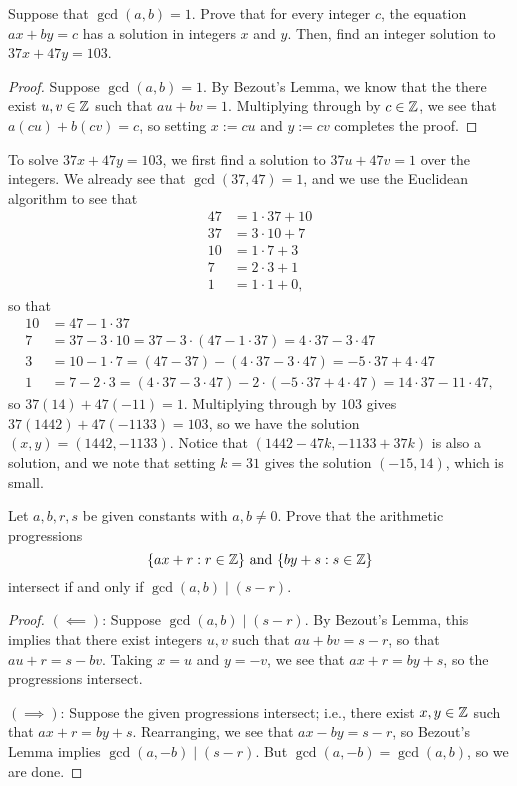 \documentclass{article}
\begin{document}
\begin{exercise}[Chapter 6, \#5]
Suppose that $\gcd(a,b)=1$. Prove that for every integer $c$, the equation $ax+by = c$ has a solution in integers $x$ and $y$. Then, find an integer solution to $37x+47y=103$.
\end{exercise}
\begin{proof}
Suppose $\gcd(a,b)=1$. By Bezout's Lemma, we know that the there exist $u,v\in \mathbb Z$ such that $au+bv=1$. Multiplying through by $c\in \mathbb Z$, we see that $a(cu) + b(cv) = c$, so setting $x := cu$ and $y := cv$ completes the proof.
\end{proof}

To solve $37x+47y=103$, we first find a solution to $37u + 47v = 1$ over the integers. We already see that $\gcd(37, 47) = 1$, and we use the Euclidean algorithm to see that
\begin{align*}
47 &= 1\cdot 37 + 10 \\
37 &= 3\cdot 10 + 7 \\
10 &= 1\cdot 7 + 3 \\
7 &= 2\cdot 3 + 1 \\
1 &= 1\cdot 1 + 0,
\end{align*}
so that
\begin{align*}
    10 &= 47 - 1\cdot 37 \\
    7 &= 37 - 3\cdot 10 = 37 - 3\cdot (47 - 1\cdot 37) = 4\cdot 37 - 3\cdot 47 \\
    3 &= 10 - 1\cdot 7 = (47 - 37) - (4\cdot 37 - 3\cdot 47) = -5\cdot 37 + 4\cdot 47 \\
    1 &= 7 - 2\cdot 3 = (4\cdot 37 - 3\cdot 47) - 2\cdot (-5\cdot 37 + 4\cdot 47) = 14\cdot 37 - 11\cdot 47,
\end{align*}
so $37(14) + 47(-11) = 1$. Multiplying through by $103$ gives $37(1442) + 47(-1133) = 103$, so we have the solution $(x,y) ={(1442,-1133)}$. Notice that $(1442 -47k, -1133+37k)$ is also a solution, and we note that setting $k=31$ gives the solution $\boxed{(-15, 14)}$, which is small.

\begin{exercise}
Let $a,b,r,s$ be given constants with $a,b\neq 0$. Prove that the arithmetic progressions
$$\{ax+r: r\in \mathbb Z\} \text{ and } \{by+s: s\in \mathbb Z\}$$
intersect if and only if $\gcd(a,b) \mid (s-r)$.
\end{exercise}
\begin{proof}
$(\impliedby)$: Suppose $\gcd(a,b)\mid (s-r)$. By Bezout's Lemma, this implies that there exist integers $u,v$ such that $au + bv = s-r$, so that $au + r = s - bv$. Taking $x = u$ and $y=-v$, we see that $ax + r = by + s$, so the progressions intersect.

$(\implies)$: Suppose the given progressions intersect; i.e., there exist $x,y\in\mathbb Z$ such that $ax+r = by+s$. Rearranging, we see that $ax - by = s-r$, so Bezout's Lemma implies $\gcd(a,-b) \mid (s-r)$. But $\gcd(a,-b) = \gcd(a,b)$, so we are done.
\end{proof}
\end{document}
